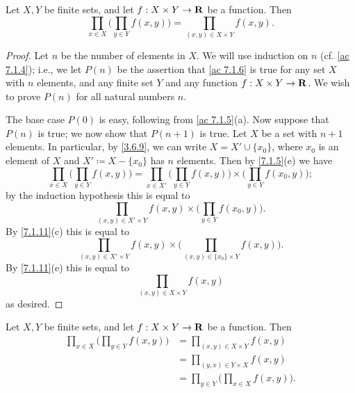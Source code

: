 \begin{additional corollary}\label{ac 7.1.6}
Let \(X, Y\) be finite sets, and let \(f : X \times Y \to \mathbf{R}\) be a function.
Then
\[
  \prod_{x \in X} \bigg(\prod_{y \in Y} f(x, y)\bigg) = \prod_{(x, y) \in X \times Y} f(x, y).
\]
\end{additional corollary}

\begin{proof}
  Let \(n\) be the number of elements in \(X\).
  We will use induction on \(n\) (cf. \cref{ac 7.1.4});
  i.e., we let \(P(n)\) be the assertion that \cref{ac 7.1.6} is true for any set \(X\) with \(n\) elements, and any finite set \(Y\) and any function \(f : X \times Y \to \mathbf{R}\).
  We wish to prove \(P(n)\) for all natural numbers \(n\).

  The base case \(P(0)\) is easy, following from \cref{ac 7.1.5}(a).
  Now suppose that \(P(n)\) is true;
  we now show that \(P(n + 1)\) is true.
  Let \(X\) be a set with \(n + 1\) elements.
  In particular, by \cref{3.6.9}, we can write \(X = X' \cup \{x_0\}\), where \(x_0\) is an element of \(X\) and \(X' \coloneqq X - \{x_0\}\) has \(n\) elements.
  Then by \cref{7.1.5}(e) we have
  \[
    \prod_{x \in X} \bigg(\prod_{y \in Y} f(x, y)\bigg) = \prod_{x \in X'} \bigg(\prod_{y \in Y} f(x, y)\bigg) \times \bigg(\prod_{y \in Y} f(x_0, y)\bigg);
  \]
  by the induction hypothesis this is equal to
  \[
    \prod_{(x, y) \in X' \times Y} f(x, y) \times \bigg(\prod_{y \in Y} f(x_0, y)\bigg).
  \]
  By \cref{7.1.11}(c) this is equal to
  \[
    \prod_{(x, y) \in X' \times Y} f(x, y) \times \bigg(\prod_{(x, y) \in \{x_0\} \times Y} f(x, y)\bigg).
  \]
  By \cref{7.1.11}(e) this is equal to
  \[
    \prod_{(x, y) \in X \times Y} f(x, y)
  \]
  as desired.
\end{proof}

\begin{additional corollary}\label{ac 7.1.7}
Let \(X, Y\) be finite sets, and let \(f : X \times Y \to \mathbf{R}\) be a function.
Then
\begin{align*}
  \prod_{x \in X} \bigg(\prod_{y \in Y} f(x, y)\bigg) & = \prod_{(x, y) \in X \times Y} f(x, y)                \\
                                                      & = \prod_{(y, x) \in Y \times X} f(x, y)                \\
                                                      & = \prod_{y \in Y} \bigg(\prod_{x \in X} f(x, y)\bigg).
\end{align*}
\end{additional corollary}

